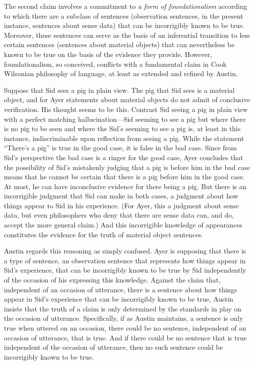 \documentclass[11pt]{article}
\begin{document}
The second claim involves a commitment to \emph{a form of foundationalism} according to which there are a subclass of sentences (observation sentences, in the present instance, sentences about sense data) that can be incorrigibly known to be true. Moreover, these sentences can serve as the basis of an inferential transition to less certain sentences (sentences about material objects) that can nevertheless be known to be true on the basis of the evidence they provide. However, foundationalism, so conceived, conflicts with a fundamental claim in Cook Wilsonian philosophy of language, at least as extended and refined by Austin. 

Suppose that Sid sees a pig in plain view. The pig that Sid sees is a material object, and for Ayer statements about material objects do not admit of conclusive verification. His thought seems to be this. Contrast Sid seeing a pig in plain view with a perfect matching hallucination---Sid seeming to see a pig but where there is no pig to be seen and where the Sid's seeming to see a pig is, at least in this instance, indiscriminable upon reflection from seeing a pig. While the statement ``There's a pig'' is true in the good case, it is false in the bad case. Since from Sid's perspective the bad case is a ringer for the good case, Ayer concludes that the possibility of Sid's mistakenly judging that a pig is before him in the bad case means that he cannot be certain that there is a pig before him in the good case. At most, he can have inconclusive evidence for there being a pig. But there is an incorrigible judgment that Sid can make in both cases, a judgment about how things appear to Sid in his experience. (For Ayer, this a judgment about sense data, but even philosophers who deny that there are sense data can, and do, accept the more general claim.) And this incorrigible knowledge of appearances constitutes the evidence for the truth of material object sentences.

Austin regards this reasoning as simply confused. Ayer is supposing that there is a type of sentence, an observation sentence that represents how things appear in Sid's experience, that can be incorrigibly known to be true by Sid independently of the occasion of his expressing this knowledge.  Against the claim that, independent of an occasion of utterance, there is a sentence about how things appear in Sid's experience that can be incorrigibly known to be true, Austin insists that the truth of a claim is only determined by the standards in play on the occasion of utterance. Specifically, if as Austin maintains, a sentence is only true when uttered on an occasion, there could be no sentence, independent of an occasion of utterance, that is true. And if there could be no sentence that is true independent of the occasion of utterance, then no such sentence could be incorrigibly known to be true.
\end{document}
